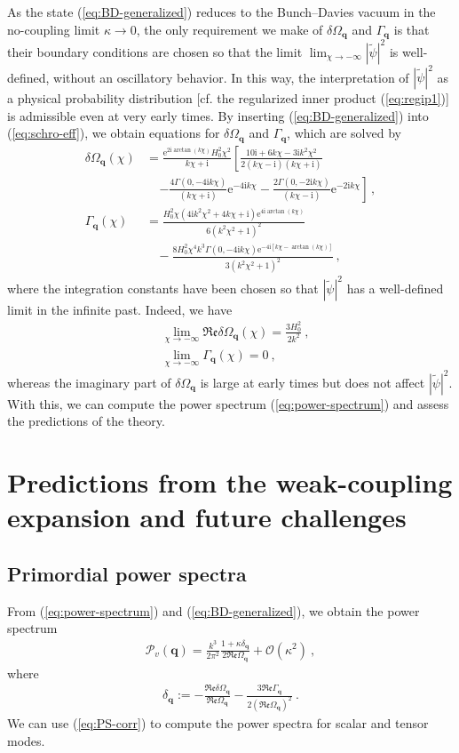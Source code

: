 \documentclass[12pt]{iopart}
\def\eq#1{\begin{equation}\begin{aligned}#1\end{aligned}\end{equation}}
\def\eref#1{(\ref{eq:#1})}
\def\e{\mathrm{e}}
\def\I{\mathrm{i}}
\def\Ob{\mathcal{O}}
\def\q{\mathbf{q}}
\begin{document}
As the state \eref{BD-generalized} reduces to the Bunch--Davies vacuum in the no-coupling limit $\kappa\to0$, the only requirement we make of $\delta\Omega_{\q}$ and $\Gamma_{\q}$ is that their boundary conditions are chosen so that the limit $\lim_{\chi\to-\infty}|\tilde{\psi}|^2$ is well-defined, without an oscillatory behavior. In this way, the interpretation of $|\tilde{\psi}|^2$ as a physical probability distribution [cf. the regularized inner product \eref{regip1}] is admissible even at very early times. By inserting \eref{BD-generalized} into \eref{schro-eff}, we obtain equations for $\delta\Omega_{\q}$ and $\Gamma_{\q}$, which are solved by
\eq{\label{eq:corrections-BD}
\delta\Omega_{\q}(\chi) &= \frac{\e^{2 \I \arctan(k\chi)}H_0^2\chi^2}{k\chi+\I}\left[\frac{10\I+6 k\chi-3 \I k^2 \chi^2}{2(k\chi-\I) (k\chi+\I)}\right.\\
&\ \ \ \ \ \left.-\frac{4 \Gamma (0,-4 \I k \chi )}{(k\chi+\I)}\e^{-4 \I k\chi}-\frac{2 \Gamma (0,-2 \I k \chi)}{(k\chi-\I)}\e^{-2 \I k\chi}\right] \,,\\
\Gamma_{\q}(\chi) &= \frac{H_0^2\chi\left(4 \I k^2\chi^2+4k\chi+\I\right)\e^{4 \I\arctan(k\chi)} }{6 \left(k^2\chi^2+1\right)^2}\\
& \ \ \ \ -\frac{8 H_0^2\chi^4 k^3 \Gamma(0,-4 \I k \chi)\e^{-4 \I \left[k\chi-\arctan(k\chi)\right]}}{3 \left(k^2\chi^2+1\right)^2} \,,
}
where the integration constants have been chosen so that $|\tilde{\psi}|^2$ has a well-defined limit in the infinite past. Indeed, we have
\eq{
&\lim_{\chi\to-\infty}\mathfrak{Re}\delta\Omega_{\q}(\chi) = \frac{3 H_0^2}{2 k^2} \ , \\
&\lim_{\chi\to -\infty}\Gamma_{\q}(\chi) = 0 \ ,
}
whereas the imaginary part of $\delta\Omega_{\q}$ is large at early times but does not affect $|\tilde{\psi}|^2$. With this, we can compute the power spectrum \eref{power-spectrum} and assess the predictions of the theory.

\section{Predictions from the weak-coupling expansion and future challenges}\label{sec:predictions}

\subsection{\label{sec:primordial}Primordial power spectra}
From \eref{power-spectrum} and \eref{BD-generalized}, we obtain the power spectrum
\eq{\label{eq:PS-corr}
\mathcal{P}_v(\q) = \frac{k^3}{2\pi^2}\frac{1+\kappa\delta_{\q}}{2\mathfrak{Re}\Omega_{\q}} + \Ob(\kappa^2)\ ,
}
where
\eq{
\delta_{\q} := -\frac{\mathfrak{Re}\delta\Omega_{\q}}{\mathfrak{Re}\Omega_{\q}}-\frac{3\mathfrak{Re}\Gamma_{\q}}{2(\mathfrak{Re}\Omega_{\q})^2} \ .
}
We can use \eref{PS-corr} to compute the power spectra for scalar and tensor modes.
\end{document}
